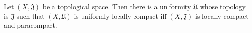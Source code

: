 Let $(X, \mathfrak{J})$ be a topological space. Then there is a uniformity $\mathfrak{U}$ whose topology is $\mathfrak{J}$ such that $(X, \mathfrak{U})$ is uniformly locally compact iff $(X, \mathfrak{J})$ is locally compact and paracompact.
